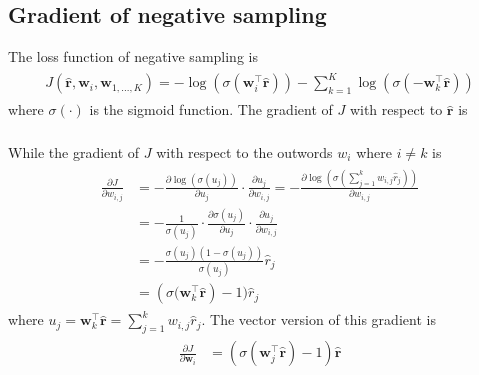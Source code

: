 \documentclass[paper=a4, fontsize=11pt]{scrartcl} %
\numberwithin{equation}{section} %
\numberwithin{figure}{section} %
\numberwithin{table}{section} %
\begin{document}
\subsection{Gradient of negative sampling}
The loss function of negative sampling is 
\begin{align} 
\begin{split}
	J(\hat{\boldsymbol{r}},\boldsymbol{w}_{i}, \boldsymbol{w}_{1,...,K}) = - \log( \sigma (\boldsymbol{w}_{i}^{\intercal} \hat{\boldsymbol{r}})) - \sum_{k=1}^{K} \log(\sigma(- \boldsymbol{w}_{k}^{\intercal} \hat{\boldsymbol{r}}))	
\end{split}					
\end{align}
where $\sigma(\cdot)$ is the sigmoid function. The gradient of $J$ with respect to $\hat{\boldsymbol{r}}$ is 
\begin{align} 
\begin{split}
	\	
\end{split}					
\end{align}
While the gradient of $J$ with respect to the outwords $w_{i}$ where $i \neq k$ is
\begin{align} 
\begin{split}
	\frac{\partial J}{\partial w_{i,j}} &= - \frac{\partial \log(\sigma (u_{j}))}{\partial u_{j}} \cdot \frac{\partial u_{j}}{\partial w_{i,j}}  =  - \frac{\partial \log( \sigma( \sum_{j=1}^{k} w_{i,j} \hat{r}_{j}) )}{\partial w_{i,j}} \\
	& = - \frac{1}{\sigma(u_{j})} \cdot \frac{\partial \sigma(u_{j})}{\partial u_{j}} \cdot \frac{\partial u_{j}}{\partial w_{i,j}} \\
	& = - \frac{\sigma(u_{j})(1-\sigma(u_{j})) }{\sigma(u_{j})} \hat{r}_{j}\\
	& = \left(\sigma(\boldsymbol{w}_{k}^{\intercal}\hat{\boldsymbol{r}}  \right) - 1)\hat{r}_{j}	
\end{split}					
\end{align}
where $u_{j} = \boldsymbol{w}_{k}^{\intercal} \hat{\boldsymbol{r}} = \sum_{j=1}^{k}w_{i,j}\hat{r}_{j}$. The vector version of this gradient is
\begin{align} 
\begin{split}
	\frac{\partial J}{\partial \boldsymbol{w}_{i}} & = \left(\sigma(\boldsymbol{w}_{j}^{\intercal}\hat{\boldsymbol{r}} ) - 1 \right)\hat{\boldsymbol{r}}	
\end{split}					
\end{align}
 
\end{document}
